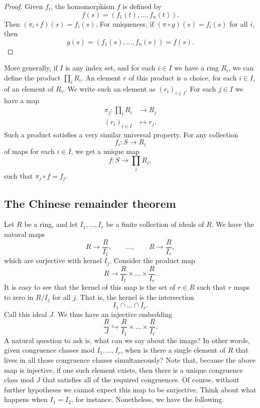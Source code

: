 \documentclass{article}
\newcommand{\rb}[1]{\left( #1 \right)}
\theoremstyle{definition}\newtheorem{definition}{Definition}[subsection]
\theoremstyle{definition}\newtheorem{remark}[definition]{Remark}
\theoremstyle{definition}\newtheorem*{example}{Example}
\theoremstyle{definition}\newtheorem*{note}{Note}
\begin{document}
\begin{proof}
Given $ f_i $, the homomorphism $ f $ is defined by
$$ f\rb{s} = \rb{f_1\rb{t}, \dots, f_n\rb{t}}. $$
Then $ \rb{\pi_i \circ f}\rb{s} = f_i\rb{s} $. For uniqueness, if $ \rb{\pi \circ g}\rb{s} = f_i\rb{s} $ for all $ i $, then
$$ g\rb{s} = \rb{f_1\rb{s}, \dots, f_n\rb{s}} = f\rb{s}. $$
\end{proof}

More generally, if $ I $ is any index set, and for each $ i \in I $ we have a ring $ R_i $, we can define the product $ \prod_i R_i $. An element $ r $ of this product is a choice, for each $ i \in I $, of an element of $ R_i $. We write such an element as $ \rb{r_i}_{i \in I} $. For each $ j \in I $ we have a map
\begin{align*}
\pi_j : \prod_i R_i & \to R_j \\
\rb{r_i}_{i \in I} & \mapsto r_j.
\end{align*}
Such a product satisfies a very similar universal property. For any collection
$$ f_i : S \to R_i $$
of maps for each $ i \in I $, we get a unique map
$$ f : S \to \prod_i R_i, $$
such that $ \pi_j \circ f = f_j $.

\subsection{The Chinese remainder theorem}

Let $ R $ be a ring, and let $ I_1, \dots, I_r $ be a finite collection of ideals of $ R $. We have the natural maps
$$ R \to \dfrac{R}{I_1}, \qquad \dots, \qquad R \to \dfrac{R}{I_r}, $$
which are surjective with kernel $ I_j $. Consider the product map
$$ R \to \dfrac{R}{I_1} \times \dots \times \dfrac{R}{I_r}. $$
It is easy to see that the kernel of this map is the set of $ r \in R $ such that $ r $ maps to zero in $ R / I_j $ for all $ j $. That is, the kernel is the intersection
$$ I_1 \cap \dots \cap I_r. $$
Call this ideal $ J $. We thus have an injective embedding
$$ \dfrac{R}{J} \hookrightarrow \dfrac{R}{I_1} \times \dots \times \dfrac{R}{I_r}. $$
A natural question to ask is, what can we say about the image? In other words, given congruence classes mod $ I_1, \dots, I_r $, when is there a single element of $ R $ that lives in all those congruence classes simultaneously? Note that, because the above map is injective, if one such element exists, then there is a unique congruence class mod $ J $ that satisfies all of the required congruences. Of course, without further hypotheses we cannot expect this map to be surjective. Think about what happens when $ I_1 = I_2 $, for instance. Nonetheless, we have the following.
\end{document}
